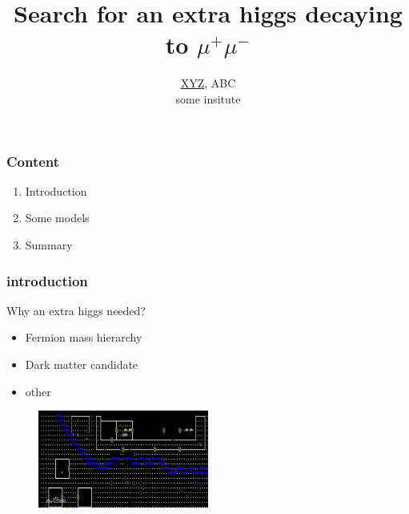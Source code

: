 \documentclass[10pt,reqno]{beamer}
\newcommand{\mup}{\mu^{+}}
\newcommand{\mum}{\mu^{-}}
\begin{document}
 

\begin{frame} 

\title{Search for an extra higgs decaying to $\mup\mum$}
\author{\underline{XYZ}, ABC \\ some insitute}
\titlepage

\end{frame}

\begin{frame} 



\frametitle{Content}



\begin{enumerate}
\item Introduction
\item Some models
\item Summary
\end{enumerate} 



\end{frame} 

\begin{frame} 



\frametitle{introduction~\label{intro}}



Why an extra higgs needed?

\begin{itemize}
\item Fermion mass hierarchy
\item Dark matter candidate
\item other
\end{itemize} 



\begin{figure}[htbp] 
\includegraphics[width =0.5\textwidth]{fig/nethack.jpg} 
\end{figure} 



\end{frame} 
\end{document}
